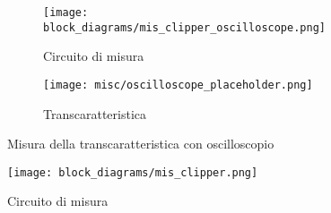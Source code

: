 \begin{figure}[H]
    \centering

    \begin{subfigure}{.5\textwidth}
        \centering
        \texttt{[image: block\_diagrams/mis\_clipper\_oscilloscope.png]}
        \caption{Circuito di misura}
        \label{mis_clipper_oscilloscope}
    \end{subfigure}%
    \begin{subfigure}{.5\textwidth}
        \centering
        \texttt{[image: misc/oscilloscope\_placeholder.png]}
        \caption{Transcaratteristica}
        \label{clipper_transcharacteristic}
    \end{subfigure}

    \caption{Misura della transcaratteristica con oscilloscopio}
\end{figure}

\begin{figure}[H]
    \centering
    \texttt{[image: block\_diagrams/mis\_clipper.png]}
    \caption{Circuito di misura}
    \label{mis_clipper}
\end{figure}

